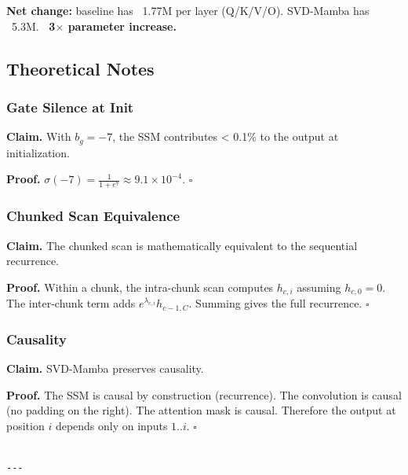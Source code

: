 \textbf{Net change:} baseline has ~1.77M per layer (Q/K/V/O). SVD-Mamba has 
~5.3M. \textbf{~3$\times$ parameter increase.}

\subsection{Theoretical Notes}

\subsubsection{Gate Silence at Init}

\textbf{Claim.} With $b_g = -7$, the SSM contributes \textless{} 0.1\% to the output at 
initialization.

\textbf{Proof.} $\sigma(-7) = \frac{1}{1 + e^7} \approx 9.1 \times 10^{-4}$. $\square$

\subsubsection{Chunked Scan Equivalence}

\textbf{Claim.} The chunked scan is mathematically equivalent to the sequential 
recurrence.

\textbf{Proof.} Within a chunk, the intra-chunk scan computes $h_{c,i}$ assuming 
$h_{c,0} = 0$. The inter-chunk term adds $e^{\lambda_{c,i}} h_{c-1, C}$. 
Summing gives the full recurrence. $\square$

\subsubsection{Causality}

\textbf{Claim.} SVD-Mamba preserves causality.

\textbf{Proof.} The SSM is causal by construction (recurrence). The convolution 
is causal (no padding on the right). The attention mask is causal. Therefore 
the output at position $i$ depends only on inputs $1..i$. $\square$
\begin{lstlisting}

---
\end{lstlisting}